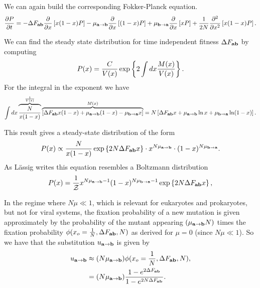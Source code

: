 We can again build the corresponding Fokker-Planck equation.
\begin{equation}
  {\partial P \over \partial t} =
  - \Delta F_{\mathbf{ab}} {\partial \over \partial x} \left[ x (1 - x) P \right] -
  \mu_{\mathbf{a} \rightarrow \mathbf{b}} {\partial \over \partial x} \left[ (1 - x) P \right] +
  \mu_{\mathbf{b} \rightarrow \mathbf{a}} {\partial \over \partial x} \left[ x P \right] +
  {1 \over 2N} {\partial^2 \over \partial x^2} \left[ x (1 - x) P \right].
\end{equation}

We can find the steady state distribution for time independent fitness $\Delta F_{\mathbf{ab}}$ by
computing
\begin{equation}
  P(x) = {C \over V(x)} \exp\left\{ 2 \int dx {M(x) \over V(x)} \right\}.
\end{equation}
For the integral in the exponent we have
\begin{equation}
  \int dx \overbrace{{N \over x (1 - x)}}^{1 \over V(x)}
  \overbrace{\left[ \Delta F_{\mathbf{ab}} x ( 1 - x) + \mu_{\mathbf{a} \rightarrow \mathbf{b}} (1 - x) - \mu_{\mathbf{b} \rightarrow \mathbf{a}} x \right]}^
  {M(x)} =
  N \left[ \Delta F_{\mathbf{ab}} x + \mu_{\mathbf{a} \rightarrow \mathbf{b}} \ln x + \mu_{\mathbf{b} \rightarrow \mathbf{a}} \ln (1 - x) \right].
\end{equation}

This result gives a steady-state distribution of the form
\begin{equation}
  P(x) \propto {N \over x (1 - x)} \exp\left\{ 2 N \Delta F_{\mathbf{ab}} x \right\}
  \cdot x^{N \mu_{\mathbf{a} \rightarrow \mathbf{b}}} \cdot (1 - x)^{N \mu_{\mathbf{b} \rightarrow \mathbf{a}}}.
\end{equation}
As L\"{a}ssig writes this equation resembles a Boltzmann distribution
\begin{equation}
  P(x) = {1 \over \mathcal{Z}} x^{N \mu_{\mathbf{a} \rightarrow \mathbf{b}} - 1} (1 - x)^{N \mu_{\mathbf{b} \rightarrow \mathbf{a}} - 1}
  \exp \left\{ 2 N \Delta F_{\mathbf{ab}} x \right\},
\end{equation}

In the regime where $N \mu \ll 1$, which is relevant for eukaryotes and
prokaryotes, but not for viral systems, the fixation probability of a new
mutation is given approximately by the probability of the mutant appearing
$(\mu_{\mathbf{a} \rightarrow \mathbf{b}} N)$ times the fixation probability $\phi(x_o = {1 \over N}, \Delta F_{\mathbf{ab}}, N)$
as derived for $\mu = 0$ (since $N \mu \ll 1$). So we have that the substitution
$u_{\mathbf{a} \rightarrow \mathbf{b}}$ is given by
\begin{align}
  u_{\mathbf{a} \rightarrow \mathbf{b}} &\approx (N \mu_{\mathbf{a} \rightarrow \mathbf{b}}) \phi(x_o = {1 \over N}, \Delta F_{\mathbf{ab}}, N),\\
  &= (N \mu_{\mathbf{a} \rightarrow \mathbf{b}}) {1 - e^{2 \Delta F_{\mathbf{ab}}} \over 1 - e^{2N \Delta F_{\mathbf{ab}}}}.
\end{align}

